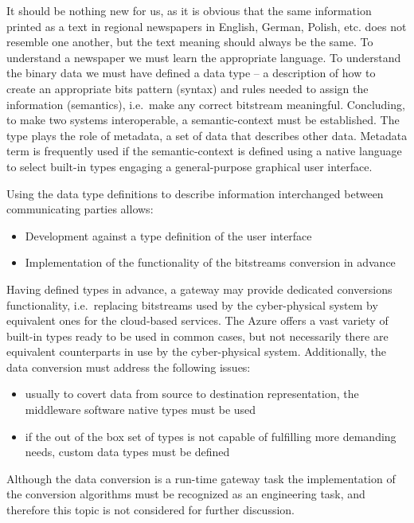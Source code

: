 \documentclass{jacsart}
\providecommand{\tightlist} { \setlength{\itemsep}{0pt}\setlength{\parskip}{0pt}}
\begin{document}
It should be nothing new for us, as it is obvious that the same
information printed as a text in regional newspapers in English, German,
Polish, etc. does not resemble one another, but the text meaning should
always be the same. To understand a newspaper we must learn the
appropriate language. To understand the binary data we must have defined
a data type -- a description of how to create an appropriate bits
pattern (syntax) and rules needed to assign the information (semantics),
i.e.~make any correct bitstream meaningful. Concluding, to make two
systems interoperable, a semantic-context must be established. The type
plays the role of metadata, a set of data that describes other data.
Metadata term is frequently used if the semantic-context is defined
using a native language to select built-in types engaging a
general-purpose graphical user interface.

Using the data type definitions to describe information interchanged
between communicating parties allows:

\begin{itemize}
\tightlist
\item
  Development against a type definition of the user interface
\item
  Implementation of the functionality of the bitstreams conversion in
  advance
\end{itemize}

Having defined types in advance, a gateway may provide dedicated conversions functionality, i.e.~replacing bitstreams used by the cyber-physical system by equivalent ones for the cloud-based services. The Azure offers a vast variety of built-in types ready to be used in common cases, but not necessarily there are equivalent counterparts in use by the cyber-physical system. Additionally, the data conversion must address the following issues:

\begin{itemize}
\tightlist
\item
  usually to covert data from source to destination representation, the
  middleware software native types must be used
\item
  if the out of the box set of types is not capable of fulfilling more
  demanding needs, custom data types must be defined
\end{itemize}

Although the data conversion is a run-time gateway task the
implementation of the conversion algorithms must be recognized as an
engineering task, and therefore this topic is not considered for further
discussion.
\end{document}
